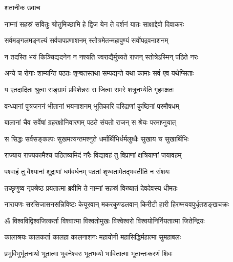 शतानीक उवाच

\twolineshloka
{नाम्नां सहस्रं सवितुः श्रोतुमिच्छामि हे द्विज}
{येन ते दर्शनं यातः साक्षाद्देवो दिवाकरः}

\twolineshloka
{सर्वमङ्गलमङ्गल्यं सर्वपापप्रणाशनम्}
{स्तोत्रमेतन्महापुण्यं सर्वोपद्रवनाशनम्}

\twolineshloka
{न तदस्ति भयं किञ्चिद्यदनेन न नश्यति}
{ज्वराद्यैर्मुच्यते राजन् स्तोत्रेऽस्मिन् पठिते नरः}

\twolineshloka
{अन्ये च रोगाः शाम्यन्ति पठतः शृण्वतस्तथा}
{सम्पद्यन्ते यथा कामाः सर्व एव यथेप्सिताः}

\twolineshloka
{य एतदादितः श्रुत्वा सङ्ग्रामं प्रविशेन्नरः}
{स जित्वा समरे शत्रूनभ्येति गृहमक्षतः}

\twolineshloka
{वन्ध्यानां पुत्रजननं भीतानां भयनाशनम्}
{भूतिकारि दरिद्राणां कुष्ठिनां परमौषधम्}

\twolineshloka
{बालानां चैव सर्वेषां ग्रहरक्षोनिवारणम्}
{पठते संयतो राजन् स श्रेयः परमाप्नुयात्}

\twolineshloka
{स सिद्धः सर्वसङ्कल्पः सुखमत्यन्तमश्नुते}
{धर्मार्थिभिर्धर्मलुब्धैः सुखाय च सुखार्थिभिः}

\twolineshloka
{राज्याय राज्यकामैश्च पठितव्यमिदं नरैः}
{विद्यावहं तु विप्राणां क्षत्रियाणां जयावहम्}

\twolineshloka
{पश्वाहं तु वैश्यानां शूद्राणां धर्मवर्धनम्}
{पठतां शृण्वतामेतद्भवतीति न संशयः}

\twolineshloka
{तच्छृणुष्व नृपश्रेष्ठ प्रयतात्मा ब्रवीमि ते}
{नाम्नां सहस्रं विख्यातं देवदेवस्य धीमतः}


{नारायणः सरसिजासनसन्निविष्टः}
{केयूरवान् मकरकुण्डलवान् किरीटी}
{हारी हिरण्मयवपुर्धृतशङ्खचक्रः}

\resetShloka
\twolineshloka
{ॐ विश्वविद्विश्वजित्कर्ता विश्वात्मा विश्वतोमुखः}
{विश्वेश्वरो विश्वयोनिर्नियतात्मा जितेन्द्रियः}%

\twolineshloka
{कालाश्रयः कालकर्ता कालहा कालनाशनः}
{महायोगी महासिद्धिर्महात्मा सुमहाबलः}%

\twolineshloka
{प्रभुर्विभुर्भूतनाथो भूतात्मा भुवनेश्वरः}
{भूतभव्यो भावितात्मा भूतान्तःकरणं शिवः}%

